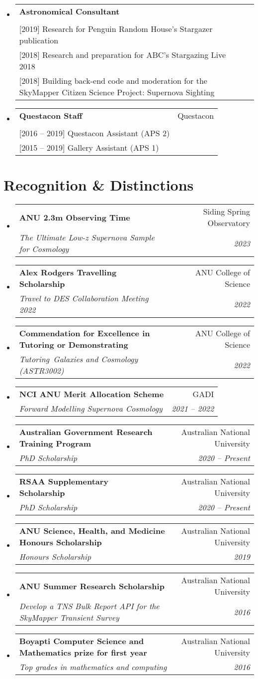 \documentclass[letterpaper,11pt]{article}
\makeatletter
\newcommand{\resumeItem}[1]{
  \item\small{
    {#1 \vspace{-2pt}}
  }
}
\newcommand{\resumeSubheading}[4]{
  \vspace{-2pt}\item
    \begin{tabular*}{0.97\textwidth}[t]{l@{\extracolsep{\fill}}r}
      \textbf{#1} & #2 \\
      \textit{\small#3} & \textit{\small #4} \\
    \end{tabular*}\vspace{-7pt}
}
\newcommand{\resumeSubHeadingListStart}{\begin{itemize}[leftmargin=0.15in, label={}]}
\newcommand{\resumeSubHeadingListEnd}{\end{itemize}}
\newcommand{\resumeItemListStart}{\begin{itemize}}
\newcommand{\resumeItemListEnd}{\end{itemize}\vspace{-5pt}}
\newcommand{\experienceElement}[5]{%
    \resumeSubHeadingListStart
        \resumeSubheading
            {#1}
            {#2}
            {\makecell[l]{#3}}
            {#4}
            {#5}
    \resumeSubHeadingListEnd
}
\newcommand{\awardElement}[5]{%
    \resumeSubHeadingListStart
        \resumeSubheading
            {#1}
            {#2}
            {#3}
            {#4}
            \ifthenelse{\isempty{#5}}{}{%
                \resumeItemListStart
                    \renewcommand*{\do}[1]{\resumeItem{##1}}
                    \docsvlist{#5}%
                \resumeItemListEnd
            }%
    \resumeSubHeadingListEnd
}
\makeatother
\begin{document}
    \experienceElement{Astronomical Consultant}{}{[2020] Research for Questacon's Australia in Space exhibition\\{}[2019] Research for Penguin Random House's Stargazer publication\\{}[2018] Research and preparation for ABC's Stargazing Live 2018\\{}[2018] Building back-end code and moderation for the SkyMapper Citizen Science Project: Supernova Sighting}{}{}
    \experienceElement{Questacon Staff}{Questacon}{[2019 -- 2020] Learning Programs Presenter (APS 4)\\{}[2016 -- 2019] Questacon Assistant (APS 2)\\{}[2015 -- 2019] Gallery Assistant (APS 1)}{}{}


\section{Recognition \& Distinctions}

    \awardElement{ANU 2.3m Observing Time}{Siding Spring Observatory}{The Ultimate Low-z Supernova Sample for Cosmology}{2023}{}

    \awardElement{Alex Rodgers Travelling Scholarship}{ANU College of Science}{Travel to DES Collaboration Meeting 2022}{2022}{}
    
    \awardElement{Commendation for Excellence in Tutoring or Demonstrating}{ANU College of Science}{Tutoring~\textit{Galaxies and Cosmology (ASTR3002)}}{2022}{}

    \awardElement{NCI ANU Merit Allocation Scheme}{GADI}{Forward Modelling Supernova Cosmology}{2021 -- 2022}{}
    
    \awardElement{Australian Government Research Training Program}{Australian National University}{PhD Scholarship}{2020 -- Present}{}
    
    \awardElement{RSAA Supplementary Scholarship}{Australian National University}{PhD Scholarship}{2020 -- Present}{}
    
    \awardElement{ANU Science, Health, and Medicine Honours Scholarship}{Australian National University}{Honours Scholarship}{2019}{}
    
    \awardElement{ANU Summer Research Scholarship}{Australian National University}{Develop a TNS Bulk Report API for the SkyMapper Transient Survey}{2016}{}
    
    \awardElement{Boyapti Computer Science and Mathematics prize for first year}{Australian National University}{Top grades in mathematics and computing}{2016}{}
\end{document}
